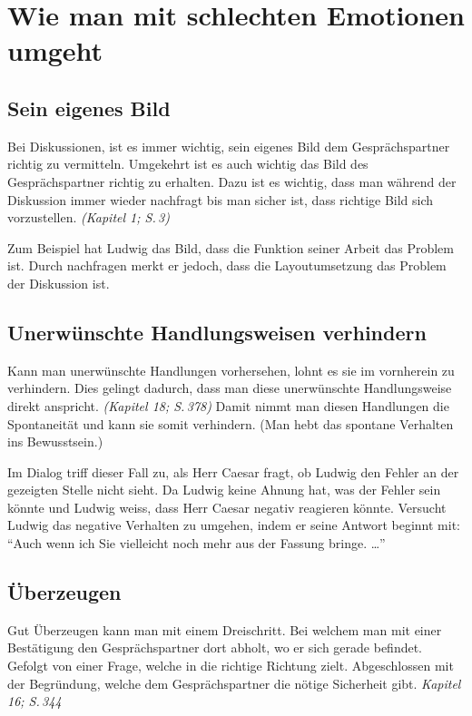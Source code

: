 \section*{Wie man mit schlechten Emotionen umgeht}




\subsection*{Sein eigenes Bild}
Bei Diskussionen, ist es immer wichtig, sein eigenes Bild dem
Gesprächspartner richtig zu vermitteln.  Umgekehrt ist es auch wichtig
das Bild des Gesprächspartner richtig zu erhalten.  Dazu ist es
wichtig, dass man während der Diskussion immer wieder nachfragt bis
man sicher ist, dass richtige Bild sich vorzustellen. \textit{(Kapitel
1; S.\,3)}

Zum Beispiel hat Ludwig das Bild, dass die Funktion seiner
Arbeit das Problem ist. Durch nachfragen merkt er jedoch, dass die
Layoutumsetzung das Problem der Diskussion ist.

\subsection*{Unerwünschte Handlungsweisen verhindern}
Kann man unerwünschte Handlungen vorhersehen, lohnt es sie im
vornherein zu verhindern.  Dies gelingt dadurch, dass man diese
unerwünschte Handlungsweise direkt anspricht. \textit{(Kapitel 18;
  S.\,378)} Damit nimmt man diesen Handlungen die Spontaneität und
kann sie somit verhindern.  (Man hebt das spontane Verhalten ins
Bewusstsein.)

Im Dialog triff dieser Fall zu, als Herr Caesar fragt, ob Ludwig den
Fehler an der gezeigten Stelle nicht sieht.  Da Ludwig keine Ahnung
hat, was der Fehler sein könnte und Ludwig weiss, dass Herr Caesar
negativ reagieren könnte.  Versucht Ludwig das negative Verhalten zu
umgehen, indem er seine Antwort beginnt mit:  "`Auch wenn ich Sie
vielleicht noch mehr aus der Fassung bringe. \dots"'

\subsection*{Überzeugen}
Gut Überzeugen kann man mit einem Dreischritt.  Bei welchem man mit
einer Bestätigung den Gesprächspartner dort abholt, wo er sich gerade
befindet.  Gefolgt von einer Frage, welche in die richtige Richtung
zielt.  Abgeschlossen mit der Begründung, welche dem Gesprächspartner
die nötige Sicherheit gibt. \emph{Kapitel 16; S.\,344}

